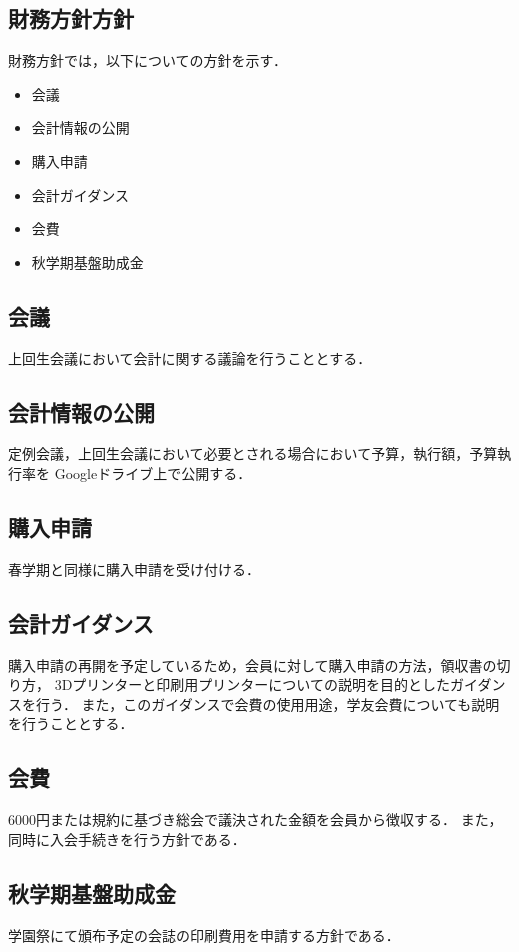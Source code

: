 \subsection*{財務方針方針}


財務方針では，以下についての方針を示す．
\begin{itemize}
  \item 会議
  \item 会計情報の公開
  \item 購入申請
  \item 会計ガイダンス
  \item 会費
  \item 秋学期基盤助成金
\end{itemize}

\subsection*{会議}
上回生会議において会計に関する議論を行うこととする．

\subsection*{会計情報の公開}
定例会議，上回生会議において必要とされる場合において予算，執行額，予算執行率を
Googleドライブ上で公開する．

\subsection*{購入申請}
春学期と同様に購入申請を受け付ける．

\subsection*{会計ガイダンス}
購入申請の再開を予定しているため，会員に対して購入申請の方法，領収書の切り方，
3Dプリンターと印刷用プリンターについての説明を目的としたガイダンスを行う．
また，このガイダンスで会費の使用用途，学友会費についても説明を行うこととする．

\subsection*{会費}
6000円または規約に基づき総会で議決された金額を会員から徴収する．
また，同時に入会手続きを行う方針である．

\subsection*{秋学期基盤助成金}
学園祭にて頒布予定の会誌の印刷費用を申請する方針である．

